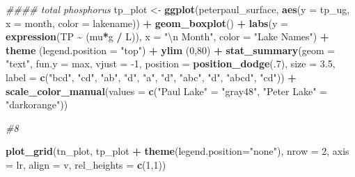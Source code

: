 \documentclass[
]{article}
\newenvironment{Shaded}{\begin{snugshade}}{\end{snugshade}}
\newcommand{\CharTok}[1]{\textcolor[rgb]{0.31,0.60,0.02}{#1}}
\newcommand{\CommentTok}[1]{\textcolor[rgb]{0.56,0.35,0.01}{\textit{#1}}}
\newcommand{\DataTypeTok}[1]{\textcolor[rgb]{0.13,0.29,0.53}{#1}}
\newcommand{\DecValTok}[1]{\textcolor[rgb]{0.00,0.00,0.81}{#1}}
\newcommand{\FloatTok}[1]{\textcolor[rgb]{0.00,0.00,0.81}{#1}}
\newcommand{\KeywordTok}[1]{\textcolor[rgb]{0.13,0.29,0.53}{\textbf{#1}}}
\newcommand{\NormalTok}[1]{#1}
\newcommand{\OperatorTok}[1]{\textcolor[rgb]{0.81,0.36,0.00}{\textbf{#1}}}
\newcommand{\StringTok}[1]{\textcolor[rgb]{0.31,0.60,0.02}{#1}}
\begin{document}
\begin{Shaded}
\begin{Highlighting}[]
\CommentTok{\#\#\#\# total phosphorus}
\NormalTok{tp\_plot <{-}}\StringTok{ }\KeywordTok{ggplot}\NormalTok{(peterpaul\_surface, }\KeywordTok{aes}\NormalTok{(}\DataTypeTok{y =}\NormalTok{ tp\_ug, }\DataTypeTok{x =}\NormalTok{ month, }\DataTypeTok{color =}\NormalTok{ lakename)) }\OperatorTok{+}
\StringTok{  }\KeywordTok{geom\_boxplot}\NormalTok{() }\OperatorTok{+}\StringTok{ }
\StringTok{  }\KeywordTok{labs}\NormalTok{(}\DataTypeTok{y =} \KeywordTok{expression}\NormalTok{(TP }\OperatorTok{\textasciitilde{}}\StringTok{ }\NormalTok{(mu}\OperatorTok{*}\NormalTok{g }\OperatorTok{/}\StringTok{ }\NormalTok{L)), }\DataTypeTok{x =} \StringTok{"}\CharTok{\textbackslash{}n}\StringTok{ Month"}\NormalTok{, }\DataTypeTok{color =} \StringTok{"Lake Names"}\NormalTok{) }\OperatorTok{+}
\StringTok{  }\KeywordTok{theme}\NormalTok{ (}\DataTypeTok{legend.position =} \StringTok{"top"}\NormalTok{) }\OperatorTok{+}\StringTok{ }\KeywordTok{ylim}\NormalTok{ (}\DecValTok{0}\NormalTok{,}\DecValTok{80}\NormalTok{) }\OperatorTok{+}
\StringTok{  }\KeywordTok{stat\_summary}\NormalTok{(}\DataTypeTok{geom =} \StringTok{"text"}\NormalTok{, }\DataTypeTok{fun.y =}\NormalTok{ max, }\DataTypeTok{vjust =} \DecValTok{{-}1}\NormalTok{, }
               \DataTypeTok{position =} \KeywordTok{position\_dodge}\NormalTok{(.}\DecValTok{7}\NormalTok{),  }\DataTypeTok{size =} \FloatTok{3.5}\NormalTok{,}
               \DataTypeTok{label =} \KeywordTok{c}\NormalTok{(}\StringTok{"bcd"}\NormalTok{, }\StringTok{"cd"}\NormalTok{, }\StringTok{"ab"}\NormalTok{, }\StringTok{"d"}\NormalTok{, }\StringTok{"a"}\NormalTok{, }\StringTok{"d"}\NormalTok{, }
                         \StringTok{"abc"}\NormalTok{, }\StringTok{"d"}\NormalTok{, }\StringTok{"abcd"}\NormalTok{, }\StringTok{"cd"}\NormalTok{)) }\OperatorTok{+}
\StringTok{  }\KeywordTok{scale\_color\_manual}\NormalTok{(}\DataTypeTok{values =} \KeywordTok{c}\NormalTok{(}\StringTok{"Paul Lake"}\NormalTok{ =}\StringTok{ "gray48"}\NormalTok{, }\StringTok{"Peter Lake"}\NormalTok{ =}\StringTok{ "darkorange"}\NormalTok{))}

\CommentTok{\#8}

\KeywordTok{plot\_grid}\NormalTok{(tn\_plot, tp\_plot }\OperatorTok{+}\StringTok{ }\KeywordTok{theme}\NormalTok{(}\DataTypeTok{legend.position=}\StringTok{"none"}\NormalTok{),  }
          \DataTypeTok{nrow =} \DecValTok{2}\NormalTok{, }\DataTypeTok{axis =} \StringTok{\textquotesingle{}lr\textquotesingle{}}\NormalTok{, }\DataTypeTok{align =} \StringTok{\textquotesingle{}v\textquotesingle{}}\NormalTok{, }\DataTypeTok{rel\_heights =} \KeywordTok{c}\NormalTok{(}\DecValTok{1}\NormalTok{,}\DecValTok{1}\NormalTok{))}
\end{Highlighting}
\end{Shaded}
\end{document}
